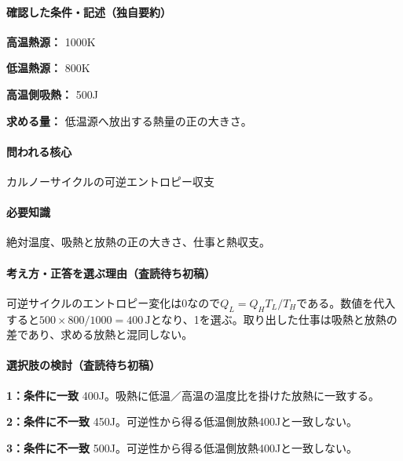\paragraph{確認した条件・記述（独自要約）}\mbox{}\par

\noindent\textbf{高温熱源：} 1000K\par

\noindent\textbf{低温熱源：} 800K\par

\noindent\textbf{高温側吸熱：} 500J\par

\noindent\textbf{求める量：} 低温源へ放出する熱量の正の大きさ。\par

\paragraph{問われる核心} カルノーサイクルの可逆エントロピー収支

\paragraph{必要知識} 絶対温度、吸熱と放熱の正の大きさ、仕事と熱収支。

\paragraph{考え方・正答を選ぶ理由（査読待ち初稿）} 可逆サイクルのエントロピー変化は0なので\(Q_L=Q_HT_L/T_H\)である。数値を代入すると\(500\times800/1000=400\,\mathrm{J}\)となり、1を選ぶ。取り出した仕事は吸熱と放熱の差であり、求める放熱と混同しない。

\paragraph{選択肢の検討（査読待ち初稿）}\mbox{}\par

\noindent\textbf{1：条件に一致} 400J。吸熱に低温／高温の温度比を掛けた放熱に一致する。\par

\noindent\textbf{2：条件に不一致} 450J。可逆性から得る低温側放熱400Jと一致しない。\par

\noindent\textbf{3：条件に不一致} 500J。可逆性から得る低温側放熱400Jと一致しない。\par

